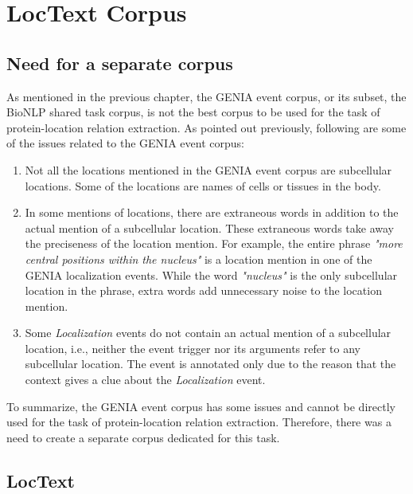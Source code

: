 \chapter{LocText Corpus}\label{chapter:corpus}

\section{Need for a separate corpus}

As mentioned in the previous chapter, the GENIA event corpus, or its subset, the BioNLP shared task corpus, is not the best corpus to be used for the task of protein-location relation extraction. As pointed out previously, following are some of the issues related to the GENIA event corpus:

\begin{enumerate}

\item Not all the locations mentioned in the GENIA event corpus are subcellular locations. Some of the locations are names of cells or tissues in the body.

\item In some mentions of locations, there are extraneous words in addition to the actual mention of a subcellular location. These extraneous words take away the preciseness of the location mention. For example, the entire phrase \textit{"more central positions within the nucleus"} is a location mention in one of the GENIA localization events. While the word \textit{"nucleus"} is the only subcellular location in the phrase, extra words add unnecessary noise to the location mention.

\item Some \textit{Localization} events do not contain an actual mention of a subcellular location, i.e., neither the event trigger nor its arguments refer to any subcellular location. The event is annotated only due to the reason that the context gives a clue about the \textit{Localization} event.

\end{enumerate}

To summarize, the GENIA event corpus has some issues and cannot be directly used for the task of protein-location relation extraction. Therefore, there was a need to create a separate corpus dedicated for this task.

\section{LocText}\label{sec:LocTextCorpus}

